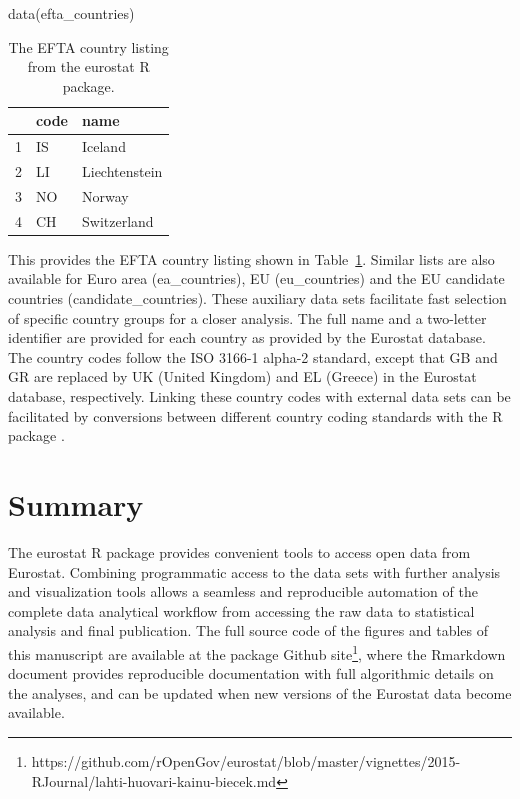 \begin{example}
data(efta_countries)
\end{example}

\begin{table}[b]
\centering
\begin{tabular}{rll}
\toprule
  \hline
  & code & name \\ 
  \hline
  1 & IS & Iceland \\ 
  2 & LI & Liechtenstein \\ 
  3 & NO & Norway \\ 
  4 & CH & Switzerland \\ 
   \hline
\bottomrule   
\end{tabular}
\label{tab:efta}
\caption{The EFTA country listing from the eurostat R package.}
\end{table}


This provides the EFTA country listing shown in
Table~\ref{tab:efta}. Similar lists are also available for Euro area
(ea\_countries), EU (eu\_countries) and the EU candidate countries
(candidate\_countries). These auxiliary data sets facilitate fast
selection of specific country groups for a closer analysis. The full
name and a two-letter identifier are provided for each country as
provided by the Eurostat database. The country codes follow the ISO
3166-1 alpha-2 standard, except that GB and GR are replaced by UK
(United Kingdom) and EL (Greece) in the Eurostat database,
respectively. Linking these country codes with external data sets can
be facilitated by conversions between different country coding
standards with the  R
package \citep{countrycode}.





\section{Summary}

The eurostat R package provides convenient tools to access open data
from Eurostat. Combining programmatic access to the data sets with
further analysis and visualization tools allows a seamless and
reproducible automation of the complete data analytical workflow from
accessing the raw data to statistical analysis and final
publication. The full source code of the figures and tables of this
manuscript are available at the package Github
site\footnote{https://github.com/rOpenGov/eurostat/blob/master/vignettes/2015-RJournal/lahti-huovari-kainu-biecek.md},
where the Rmarkdown document provides reproducible documentation with
full algorithmic details on the analyses, and can be updated when new
versions of the Eurostat data become available.


